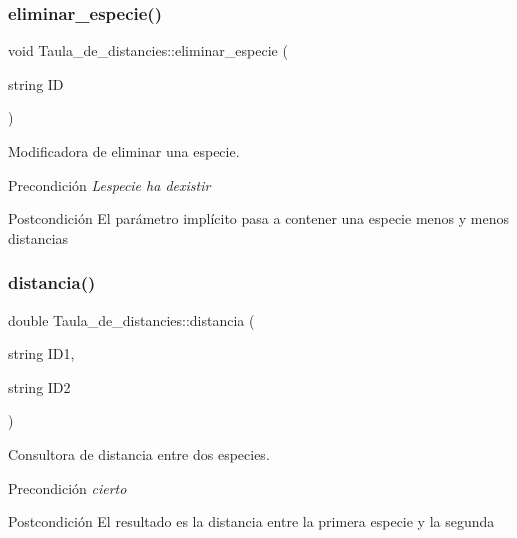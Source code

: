 \subsubsection{\texorpdfstring{eliminar\+\_\+especie()}{eliminar\_especie()}}
{\footnotesize\ttfamily void Taula\+\_\+de\+\_\+distancies\+::eliminar\+\_\+especie (\begin{DoxyParamCaption}\item[{string}]{ID }\end{DoxyParamCaption})}



Modificadora de eliminar una especie. 

\begin{DoxyPrecond}{Precondición}
{\itshape L\textquotesingle{}especie ha d\textquotesingle{}existir} 
\end{DoxyPrecond}
\begin{DoxyPostcond}{Postcondición}
El parámetro implícito pasa a contener una especie menos y menos distancias 
\end{DoxyPostcond}
\mbox{\label{class_taula__de__distancies_af3dfa32f4b29765b4ad1968bbb17ee16}} 
\subsubsection{\texorpdfstring{distancia()}{distancia()}}
{\footnotesize\ttfamily double Taula\+\_\+de\+\_\+distancies\+::distancia (\begin{DoxyParamCaption}\item[{string}]{I\+D1,  }\item[{string}]{I\+D2 }\end{DoxyParamCaption})}



Consultora de distancia entre dos especies. 

\begin{DoxyPrecond}{Precondición}
{\itshape cierto} 
\end{DoxyPrecond}
\begin{DoxyPostcond}{Postcondición}
El resultado es la distancia entre la primera especie y la segunda 
\end{DoxyPostcond}
\mbox{\label{class_taula__de__distancies_a494108f6c1af52fd9f8032d1ec78fc32}} 
